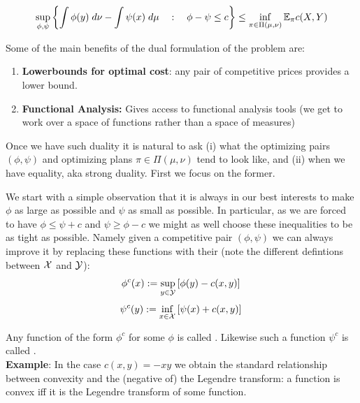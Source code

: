 \begin{thm}
    \[\sup_{\phi, \psi} \left\{ \int \phi(y) \; d\nu  -\int \psi(x) \; d\mu \quad : \quad \phi - \psi \leq c\right\} \leq \inf_{\pi \in \Pi(\mu, \nu)} \mathbb{E}_\pi c(X,Y) \]
\end{thm}
%
\noindent Some of the main benefits of the dual formulation of the problem are:

\begin{enumerate}
    \item \textbf{Lowerbounds for optimal cost}: any pair of competitive prices provides a lower bound.
    \item \textbf{Functional Analysis: }Gives access to functional analysis tools (we get to work over a space of functions rather than a space of measures)
\end{enumerate}

\noindent Once we have such duality it is natural to ask (i) what the optimizing pairs $(\phi, \psi)$ and optimizing plans $\pi \in \Pi(\mu, \nu)$ tend to look like, and (ii) when we have equality, aka strong duality. First we focus on the former. 

We start with a simple observation that it is always in our best interests to make $\phi$ as large as possible and $\psi$ as small as possible. In particular, as we are forced to have $\phi \leq \psi + c$ and $\psi \geq  \phi - c$ we might as well choose these inequalities to be as tight as possible. Namely given a competitive pair $(\phi, \psi)$ we can always improve it by replacing these functions with their  (note the different defintions between ${\mathcal X}$ and ${\mathcal Y}$): 
%
\begin{equation}
    \phi^c(x) := \sup_{y \in {\mathcal Y}} \left[\phi(y) - c(x,y) \right] \\
    \label{eqn:phi^c}
\end{equation}
\begin{equation}
    \psi^c(y) := \inf_{x \in {\mathcal X}} \left[\psi(x) + c(x,y) \right] \\
    \label{eqn:psi^c}
\end{equation}

\noindent Any function of the form $\phi^c$ for some $\phi$ is called . Likewise such a function $\psi^c$ is called .\\

\noindent \textbf{Example}: In the case $c(x,y) = -xy$ we obtain the standard relationship between convexity and the (negative of) the Legendre transform: a function is convex iff it is the Legendre transform of some function.\\

